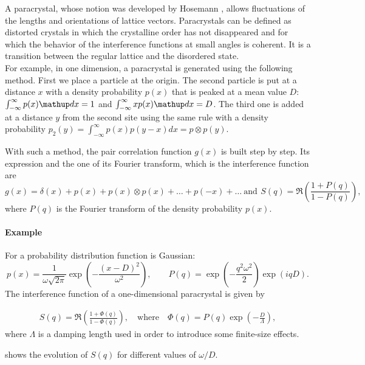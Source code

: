 A paracrystal, whose notion was developed by Hosemann \cite{Hos51},
allows fluctuations of the lengths and orientations of lattice vectors.
Paracrystals can be defined as distorted crystals
in which the crystalline order has not disappeared
and for which the behavior of the interference functions at small angles is coherent.
It is a transition between the regular lattice and the disordered state.\\

For example, in one dimension, a paracrystal is generated using the following method. First we place a particle at the origin. The second particle is put at a distance $x$ with a density probability $p(x)$ that is peaked at a mean value $D$: $\int_{-\infty} ^{\infty}p(x)\d x=1$
and $\int_{-\infty}^{\infty}xp(x)\d x=D$.
The third one is added at a distance $y$ from the second site
using the same rule with a density probability
$p_2(y)= \int_{-\infty}^{\infty}p(x)p(y-x)dx=p\otimes p(y)$.

With such a method, the pair correlation function $g(x)$ is built step by step.
Its expression and the one of its Fourier transform, which is the interference function are
\begin{equation*}
g(x)=\delta(x)+ p(x)+ p(x)\otimes p(x)+\ldots + p(-x)+\ldots \: \mathrm{and}\:\, S(q)=\Re\left(\dfrac{1+P(q)}{1-P(q)}\right),
\end{equation*}
 where $P(q)$ is the Fourier transform of the density probability $p(x)$.\\

\paragraph{Example} For a probability distribution function is Gaussian:
\begin{equation*}
p(x)=\frac{1}{\omega \sqrt{2\pi}} \exp\left(-\dfrac{(x-D)^2}{\omega^2}\right),\qquad P(q)=\exp\left(-\frac{q^2 \omega^2}{2}\right)\exp(iqD).
\end{equation*}
 The interference function of a one-dimensional paracrystal is given by

\begin{align*}
S(q) =\Re \left(\frac{1+\Phi(q) }{1 - \Phi(q)} \right), \quad \mathrm{where}\quad \Phi(q) = P(q)\exp\left(-\frac{D}{\Lambda}\right),
\end{align*}
where $\Lambda$ is a damping length used in order to introduce some finite-size effects.

 shows the evolution of $S(q)$ for different values of $\omega /D$.

